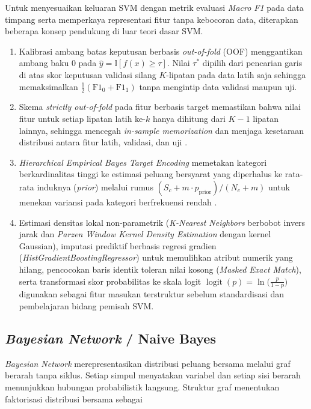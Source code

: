 Untuk menyesuaikan keluaran SVM dengan metrik evaluasi \textit{Macro F1} pada data timpang serta memperkaya representasi fitur tanpa kebocoran data, diterapkan beberapa konsep pendukung di luar teori dasar SVM.
\begin{enumerate}
    \item Kalibrasi ambang batas keputusan berbasis \textit{out-of-fold} (OOF) menggantikan ambang baku $0$ pada $\hat{y} = \mathbb{I}[f(x) \ge \tau]$. Nilai $\tau^*$ dipilih dari pencarian garis di atas skor keputusan validasi silang $K$-lipatan pada data latih saja sehingga memaksimalkan $\frac{1}{2}(\mathrm{F1}_0 + \mathrm{F1}_1)$ tanpa mengintip data validasi maupun uji.
    \item Skema \textit{strictly out-of-fold} pada fitur berbasis target memastikan bahwa nilai fitur untuk setiap lipatan latih ke-$k$ hanya dihitung dari $K-1$ lipatan lainnya, sehingga mencegah \textit{in-sample memorization} dan menjaga kesetaraan distribusi antara fitur latih, validasi, dan uji \cite{scikitlearn_pitfalls}.
    \item \textit{Hierarchical Empirical Bayes Target Encoding} memetakan kategori berkardinalitas tinggi ke estimasi peluang bersyarat yang diperhalus ke rata-rata induknya (\textit{prior}) melalui rumus $(S_c + m \cdot p_{\text{prior}}) / (N_c + m)$ untuk menekan variansi pada kategori berfrekuensi rendah \cite{miccibarreca2001target}.
    \item Estimasi densitas lokal non-parametrik (\textit{K-Nearest Neighbors} berbobot invers jarak dan \textit{Parzen Window Kernel Density Estimation} dengan kernel Gaussian), imputasi prediktif berbasis regresi gradien (\textit{HistGradientBoostingRegressor}) untuk memulihkan atribut numerik yang hilang, pencocokan baris identik toleran nilai kosong (\textit{Masked Exact Match}), serta transformasi skor probabilitas ke skala logit $\operatorname{logit}(p) = \ln\bigl(\frac{p}{1-p}\bigr)$ digunakan sebagai fitur masukan terstruktur sebelum standardisasi dan pembelajaran bidang pemisah SVM.
\end{enumerate}

\subsection{\textit{Bayesian Network} / Naive Bayes}

\textit{Bayesian Network} merepresentasikan distribusi peluang bersama melalui graf berarah tanpa siklus. Setiap simpul menyatakan variabel dan setiap sisi berarah menunjukkan hubungan probabilistik langsung. Struktur graf menentukan faktorisasi distribusi bersama sebagai

